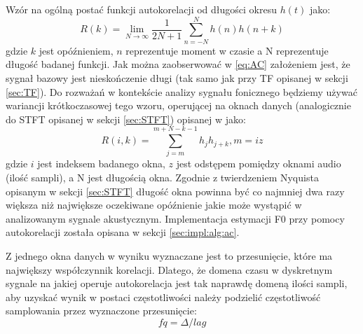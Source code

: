 \documentclass[12pt,a4paper,twoside]{mwart}
\begin{document}
Wzór na ogólną postać funkcji autokorelacji od długości okresu $h(t)$ jako:
\begin{equation}\label{eq:AC}
  R(k) = \lim_{N \to \infty} \frac{1}{2N + 1} \sum_{n=-N}^{N} h(n)h(n + k)
\end{equation}
gdzie $k$ jest opóźnieniem, $n$ reprezentuje moment w czasie a N reprezentuje długość badanej funkcji. Jak można zaobserwować w \ref{eq:AC} założeniem jest, że sygnał bazowy jest nieskończenie długi (tak samo jak przy TF opisanej w sekcji \ref{sec:TF}). Do rozważań w kontekście analizy sygnału fonicznego będziemy używać wariancji krótkoczasowej tego wzoru, operującej na oknach danych (analogicznie do STFT opisanej w sekcji \ref{sec:STFT}) opisanej w \cite{Transcription:Talkin:RAPT} jako:
\begin{equation}\label{eq:STAC}
  R(i,k) = \sum_{j=m}^{m + N - k - 1} h_jh_{j+k}, m = iz
\end{equation}
gdzie $i$ jest indeksem badanego okna, $z$ jest odstępem pomiędzy oknami audio (ilość sampli), a N jest długością okna. Zgodnie z twierdzeniem Nyquista opisanym w sekcji \ref{sec:STFT} długość okna powinna być co najmniej dwa razy większa niż największe oczekiwane opóźnienie jakie może wystąpić w analizowanym sygnale akustycznym. Implementacja estymacji F0 przy pomocy autokorelacji została opisana w sekcji \ref{sec:impl:alg:ac}.

Z jednego okna danych w wyniku wyznaczane jest to przesunięcie, które ma największy współczynnik korelacji. Dlatego, że domena czasu w dyskretnym sygnale na jakiej operuje autokorelacja jest tak naprawdę domeną ilości sampli, aby uzyskać wynik w postaci częstotliwości należy podzielić częstotliwość samplowania przez wyznaczone przesunięcie:
\begin{equation}\label{eq:AC:hz}
  fq = \Delta/lag
\end{equation}
\end{document}

